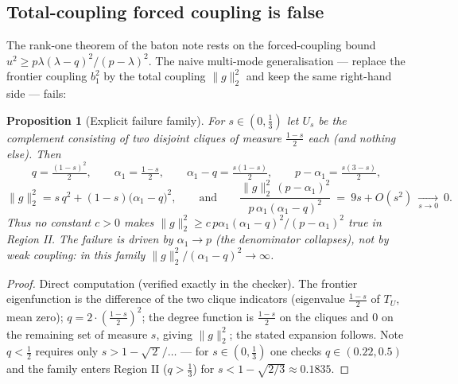 \documentclass[11pt]{article}
\newtheorem{proposition}[theorem]{Proposition}
\newcommand{\norm}[1]{\lVert #1\rVert}
\begin{document}
\subsection{Total-coupling forced coupling is false}

The rank-one theorem of the baton note rests on the forced-coupling bound $u^2\ge p\lambda(\lambda-q)^2/(p-\lambda)^2$.  The naive multi-mode generalisation --- replace the frontier coupling $b_1^2$ by the total coupling $\norm g_2^2$ and keep the same right-hand side --- fails:

\begin{proposition}[Explicit failure family]\label{prop:C-false}
For $s\in(0,\tfrac13)$ let $U_s$ be the complement consisting of two disjoint cliques of measure $\tfrac{1-s}2$ each (and nothing else).  Then
\[
        q=\tfrac{(1-s)^2}2,\qquad
        \alpha_1=\tfrac{1-s}2,\qquad
        \alpha_1-q=\tfrac{s(1-s)}2,\qquad
        p-\alpha_1=\tfrac{s(3-s)}2,
\]
\[
        \norm g_2^2=s\,q^2+(1-s)\bigl(\alpha_1-q\bigr)^2,
        \qquad\text{and}\qquad
        \frac{\norm g_2^2\,(p-\alpha_1)^2}{p\,\alpha_1(\alpha_1-q)^2}\ =\ 9s+O(s^2)\ \xrightarrow[s\to0]{}\ 0 .
\]
Thus no constant $c>0$ makes $\norm g_2^2\ge c\,p\alpha_1(\alpha_1-q)^2/(p-\alpha_1)^2$ true in Region II.  The failure is driven by $\alpha_1\to p$ (the denominator collapses), not by weak coupling: in this family $\norm g_2^2/(\alpha_1-q)^2\to\infty$.
\end{proposition}

\begin{proof}
Direct computation (verified exactly in the checker).  The frontier eigenfunction is the difference of the two clique indicators (eigenvalue $\tfrac{1-s}2$ of $T_U$, mean zero); $q=2\cdot(\frac{1-s}2)^2$; the degree function is $\tfrac{1-s}2$ on the cliques and $0$ on the remaining set of measure $s$, giving $\norm g_2^2$; the stated expansion follows.  Note $q<\tfrac12$ requires only $s>1-\sqrt{\,2\,}/\ldots$ --- for $s\in(0,\tfrac13)$ one checks $q\in(0.22,0.5)$ and the family enters Region II ($q>\tfrac13$) for $s<1-\sqrt{2/3}\approx0.1835$.
\end{proof}
\end{document}
